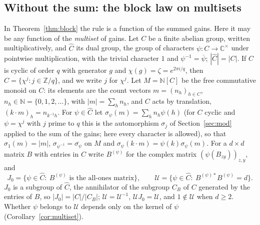 \subsection{Without the sum: the block law on multisets}
In Theorem~\ref{thm:block} the rule is a function of the summed gains. Here it may be any function of the \emph{multiset} of gains. Let $C$ be a finite abelian group, written multiplicatively, and $\hat C$ its dual group, the group of characters $\psi\colon C\to\mathbb{C}^\times$ under pointwise multiplication, with the trivial character $1$ and $\psi^{-1}=\overline\psi$; $|\hat C|=|C|$. If $C$ is cyclic of order $q$ with generator $g$ and $\chi(g)=\zeta=e^{2\pi i/q}$, then $\hat C=\{\chi^j:j\in\mathbb{Z}/q\}$, and we write $j$ for $\chi^j$. Let $M=\mathbb{N}[C]$ be the free commutative monoid on $C$: its elements are the count vectors $m=(n_h)_{h\in C}$, $n_h\in\mathbb{N}=\{0,1,2,\dots\}$, with $|m|=\sum_hn_h$, and $C$ acts by translation, $(k\cdot m)_h=n_{k^{-1}h}$. For $\psi\in\hat C$ let $\sigma_\psi(m)=\sum_hn_h\psi(h)$ (for $C$ cyclic and $\psi=\chi^j$ with $j$ prime to $q$ this is the automorphism $\sigma_j$ of Section~\ref{sec:mod} applied to the sum of the gains; here every character is allowed), so that $\sigma_1(m)=|m|$, $\sigma_{\psi^{-1}}=\overline{\sigma_\psi}$ on $M$ and $\sigma_\psi(k\cdot m)=\psi(k)\sigma_\psi(m)$. For a $d\times d$ matrix $B$ with entries in $C$ write $B^{(\psi)}$ for the complex matrix $(\psi(B_{zy}))_{z,y}$, and
\[
J_0=\{\psi\in\hat C:\ B^{(\psi)}\text{ is the all-ones matrix}\},\qquad
\mathcal{U}=\{\psi\in\hat C:\ B^{(\psi)*}B^{(\psi)}=d\}.
\]
$J_0$ is a subgroup of $\hat C$, the annihilator of the subgroup $C_B$ of $C$ generated by the entries of $B$, so $|J_0|=|C|/|C_B|$; $\mathcal{U}=\mathcal{U}^{-1}$, $\mathcal{U}J_0=\mathcal{U}$, and $1\notin \mathcal{U}$ when $d\ge2$. Whether $\psi$ belongs to $\mathcal{U}$ depends only on the kernel of $\psi$ (Corollary~\ref{cor:multiset}).

